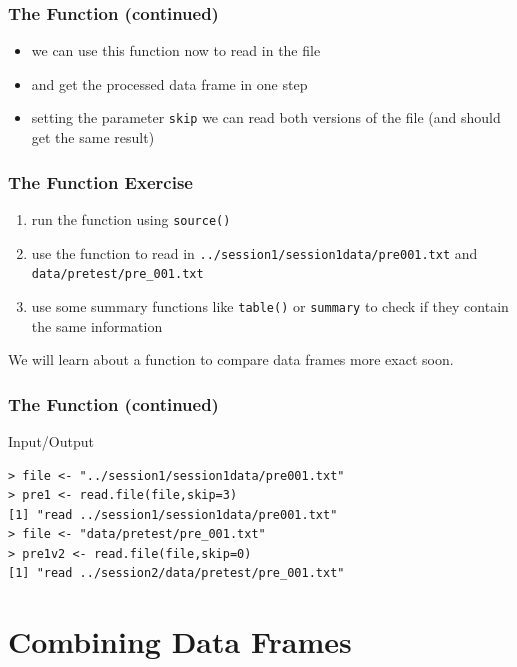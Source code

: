 \documentclass[xcolor={table},c]{beamer}
\begin{document}
\begin{frame}[fragile]\frametitle{The Function (continued)}
  \begin{itemize}
  \item we can use this function now to read in the file 
  \item and get the processed data frame in one step
  \item setting the parameter \texttt{skip} we can read both versions of the file (and should get the same result)
  \end{itemize}
\end{frame}

\begin{frame}[fragile]\frametitle{The Function Exercise}
  \begin{enumerate}
  \item run the function using \texttt{source()}
  \item use the function to read in \texttt{../session1/session1data/pre001.txt} and \texttt{data/pretest/pre\_001.txt}
  \item use some summary functions like \texttt{table()} or \texttt{summary} to check if they contain the same information
  \end{enumerate}
We will learn about a function to compare data frames more exact soon.
\end{frame}


\begin{frame}[fragile]\frametitle{The Function (continued)}
  \begin{exampleblock}{Input/Output}
\begin{verbatim}
> file <- "../session1/session1data/pre001.txt"
> pre1 <- read.file(file,skip=3)
[1] "read ../session1/session1data/pre001.txt"
> file <- "data/pretest/pre_001.txt"
> pre1v2 <- read.file(file,skip=0)
[1] "read ../session2/data/pretest/pre_001.txt"
\end{verbatim}
  \end{exampleblock}
\end{frame}


\section{Combining Data Frames}
\end{document}
